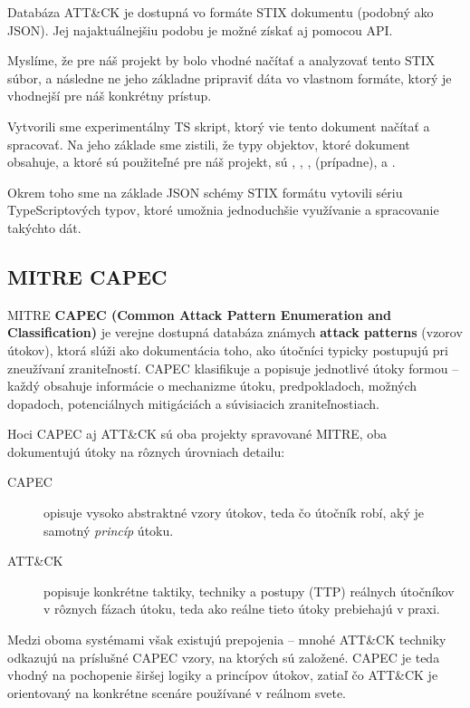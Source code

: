 \documentclass[11pt]{article}
\begin{document}
Databáza ATT\&CK je dostupná vo formáte STIX dokumentu (podobný ako JSON). Jej najaktuálnejšiu podobu je možné získať aj pomocou API.

Myslíme, že pre náš projekt by bolo vhodné načítať a analyzovať tento STIX súbor, a následne ne jeho základne pripraviť dáta vo vlastnom formáte, ktorý je vhodnejší pre náš konkrétny prístup.

Vytvorili sme experimentálny TS skript, ktorý vie tento dokument načítať a spracovať. Na jeho základe sme zistili, že typy objektov, ktoré dokument obsahuje, a ktoré sú použiteľné pre náš projekt, sú , , ,  (prípadne), a .

Okrem toho sme na základe JSON schémy STIX formátu vytovili sériu TypeScriptových typov, ktoré umožnia jednoduchšie využívanie a spracovanie takýchto dát.

\subsection{MITRE CAPEC}
MITRE \textbf{CAPEC (Common Attack Pattern Enumeration and Classification)} je verejne dostupná databáza známych \textbf{attack patterns} (vzorov útokov), ktorá slúži ako dokumentácia toho, ako útočníci typicky postupujú pri zneužívaní zraniteľností. CAPEC klasifikuje a popisuje jednotlivé útoky formou  -- každý obsahuje informácie o mechanizme útoku, predpokladoch, možných dopadoch, potenciálnych mitigáciách a súvisiacich zraniteľnostiach.

Hoci CAPEC aj ATT\&CK sú oba projekty spravované MITRE, oba dokumentujú útoky na rôznych úrovniach detailu:
\begin{description}
    \item[CAPEC] opisuje vysoko abstraktné vzory útokov, teda čo útočník robí, aký je samotný \emph{princíp} útoku.
    \item[ATT\&CK] popisuje konkrétne taktiky, techniky a postupy (TTP) reálnych útočníkov v rôznych fázach útoku, teda ako reálne tieto útoky prebiehajú v praxi.
\end{description}

Medzi oboma systémami však existujú prepojenia -- mnohé ATT\&CK techniky odkazujú na príslušné CAPEC vzory, na ktorých sú založené. CAPEC je teda vhodný na pochopenie širšej logiky a princípov útokov, zatiaľ čo ATT\&CK je orientovaný na konkrétne scenáre používané v reálnom svete.
\end{document}

